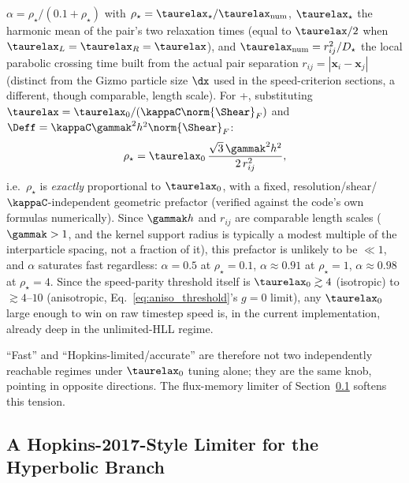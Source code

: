 $\alpha=\rho_\star/(0.1+\rho_\star)$ with
$\rho_\star=\taurelax_\star/\taurelax_{\rm num}$,
$\taurelax_\star$ the harmonic mean of the pair's two relaxation times
(equal to $\taurelax/2$ when $\taurelax_L=\taurelax_R=\taurelax$), and
$\taurelax_{\rm num}=r_{ij}^2/D_\star$ the local parabolic crossing time
built from the actual pair separation $r_{ij}=|\mathbf x_i-\mathbf x_j|$
(distinct from the Gizmo particle size $\dx$ used in the speed-criterion
sections, a different, though comparable, length scale). For
+, substituting
$\taurelax=\taurelax_0/(\kappaC\norm{\Shear}_F)$ and
$\Deff=\kappaC\gammak^2h^2\norm{\Shear}_F$:
\begin{equation}
  \rho_\star = \taurelax_0\,\frac{\sqrt3\,\gammak^2h^2}{2\,r_{ij}^2} ,
\end{equation}
i.e.\ $\rho_\star$ is \emph{exactly} proportional to $\taurelax_0$, with a
fixed, resolution/shear/$\kappaC$-independent geometric prefactor
(verified against the code's own formulas numerically). Since $\gammak h$
and $r_{ij}$ are comparable length scales ($\gammak>1$, and the kernel
support radius is typically a modest multiple of the interparticle
spacing, not a fraction of it), this prefactor is unlikely to be
$\ll1$, and $\alpha$ saturates fast regardless: $\alpha=0.5$ at
$\rho_\star=0.1$, $\alpha\approx0.91$ at $\rho_\star=1$,
$\alpha\approx0.98$ at $\rho_\star=4$. Since the speed-parity threshold
itself is $\taurelax_0\gtrsim4$ (isotropic) to $\gtrsim4$--$10$
(anisotropic, Eq.~\eqref{eq:aniso_threshold}'s $g=0$ limit), any
$\taurelax_0$ large enough to win on raw timestep speed is, in the
current implementation, already deep in the unlimited-HLL regime.

``Fast'' and ``Hopkins-limited/accurate'' are therefore not two
independently reachable regimes under $\taurelax_0$ tuning alone; they
are the same knob, pointing in opposite directions. The flux-memory
limiter of Section~\ref{sec:hyperbolic-limiter} softens this tension.

\subsection{A Hopkins-2017-Style Limiter for the Hyperbolic Branch}
\label{sec:hyperbolic-limiter}

